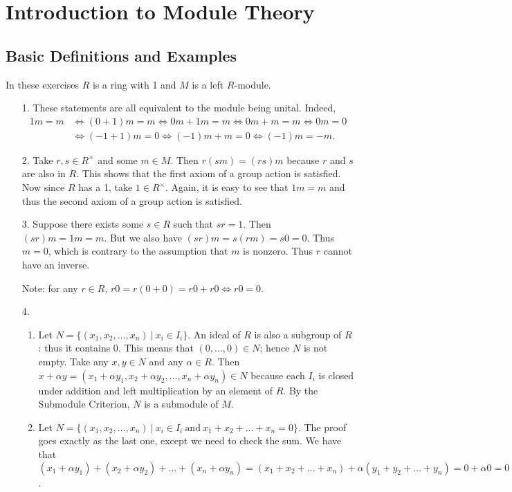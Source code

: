 \chapter{Introduction to Module Theory}

\section{Basic Definitions and Examples}

In these exercises $R$ is a ring with 1 and $M$ is a left $R$-module.

\begin{enumerate}
\item[1.]
These statements are all equivalent to the module being unital. Indeed,
\begin{align*}
1m=m &\iff (0+1)m=m \iff 0m+1m=m \iff 0m+m=m \iff 0m=0 \\
&\iff (-1+1)m=0 \iff (-1)m+m=0 \iff (-1)m=-m.
\end{align*}

\item[2.]
Take $r,s\in R^{\times}$ and some $m\in M$. Then $r(sm) = (rs)m$ because $r$ and $s$ are also in $R$. This shows that the first axiom of a group action is satisfied. Now since $R$ has a 1, take $1\in R^{\times}$. Again, it is easy to see that $1m=m$ and thus the second axiom of a group action is satisfied.

\item[3.]
Suppose there exists some $s\in R$ such that $sr=1$. Then $(sr)m=1m=m$. But we also have $(sr)m=s(rm)=s0=0$. Thus $m=0$, which is contrary to the assumption that $m$ is nonzero. Thus $r$ cannot have an inverse.

Note: for any $r\in R$, $r0 = r(0+0) = r0+r0 \iff r0=0$.

\item[4.]
\begin{enumerate}
\item
Let $N=\{(x_1,x_2,\dots,x_n)\ |\ x_i\in I_i\}$. An ideal of $R$ is also a subgroup of $R$: thus it contains $0$. This means that $(0,\dots,0)\in N$; hence $N$ is not empty. Take any $x,y\in N$ and any $\alpha\in R$. Then $x+\alpha y = (x_1+\alpha y_1,x_2+\alpha y_2,\dots,x_n+\alpha y_n)\in N$ because each $I_i$ is closed under addition and left multiplication by an element of $R$. By the Submodule Criterion, $N$ is a submodule of $M$.
\item
Let $N=\{(x_1,x_2,\dots,x_n)\ |\ x_i\in I_i\ \text{and}\ x_1+x_2+\dots+x_n=0\}$. The proof goes exactly as the last one, except we need to check the sum. We have that $(x_1+\alpha y_1)+(x_2+\alpha y_2)+\dots +(x_n+\alpha y_n) = (x_1+x_2+\dots+x_n)+\alpha(y_1+y_2+\dots+y_n) = 0+\alpha0 = 0$.
\end{enumerate}


\end{enumerate}
